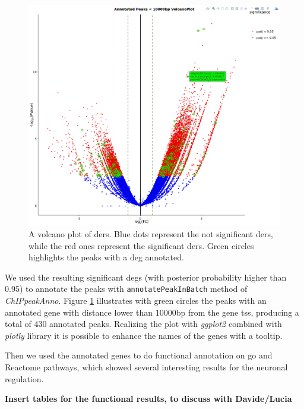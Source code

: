 \begin{figure}[H]
\centering
\includegraphics[width=\textwidth, height=\textheight, keepaspectratio]{img/descan2/Annotated_depeaks_degenes.png}
\caption[Annotated Differential Enrichment Regions Volcano]{A volcano plot of \glspl{der}. Blue dots represent the not significant \glspl{der}, while the red ones represent the significant \glspl{der}. Green circles highlights the peaks with a \gls{deg} annotated.}
\label{fig:depeakdegenessdescan}
\centering
\end{figure}

We used the resulting significant \glspl{deg} (with posterior probability higher than 0.95) to annotate the peaks with \lstinline!annotatePeakInBatch! method of \textit{ChIPpeakAnno}.
Figure 	\ref{fig:depeakdegenessdescan} illustrates with green circles the peaks with an annotated gene with distance lower than 10000bp from the gene \gls{tss}, producing a total of 430 annotated peaks.
Realizing the plot with \textit{ggplot2} combined with \textit{plotly} library it is possible to enhance the names of the genes with a tooltip.

Then we used the annotated genes to do functional annotation on \gls{go} \cite{GeneOntologyConsortium2004, GeneOntologyConsortium2015} and Reactome pathways, which showed several interesting results for the neuronal regulation.

\textbf{Insert tables for the functional results, to discuss with Davide/Lucia}







